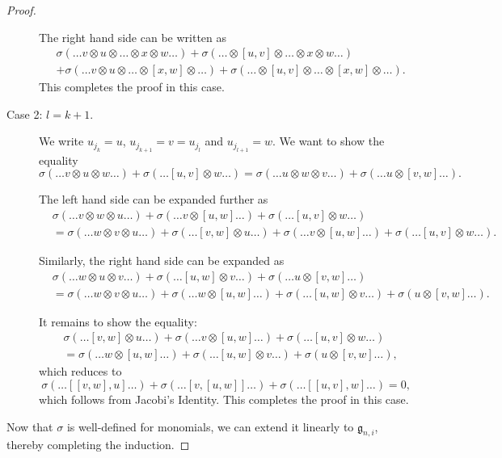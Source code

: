 \documentclass[12pt]{article}
\theoremstyle{thmstyle}
\theoremstyle{defstyle}
\newcommand{\frakg}{\mathfrak{g}}
\begin{document}
\begin{proof}
\begin{description}
    The right hand side can be written as 
    \begin{align*}
        &\sigma(\dots v\otimes u\otimes\dots\otimes x\otimes w\dots) + \sigma(\dots\otimes[u,v]\otimes\dots\otimes x\otimes w\dots)\\
        &+ \sigma(\dots v\otimes u\otimes\dots\otimes [x, w]\otimes\dots) + \sigma(\dots\otimes [u,v]\otimes\dots\otimes[x, w]\otimes\dots).
    \end{align*}
    This completes the proof in this case. 

    \item[Case 2: $l = k + 1$.] We write $u_{j_k} = u$, $u_{j_{k + 1}} = v = u_{j_l}$ and $u_{j_{l + 1}} = w$. We want to show the equality
    \begin{equation*}
        \sigma(\dots v\otimes u\otimes w\dots) + \sigma(\dots[u, v]\otimes w\dots) = \sigma(\dots u\otimes w\otimes v\dots) + \sigma(\dots u\otimes[v, w]\dots).
    \end{equation*}

    The left hand side can be expanded further as 
    \begin{align*}
        &\sigma(\dots v\otimes w\otimes u\dots) + \sigma(\dots v\otimes [u, w]\dots) + \sigma(\dots [u, v]\otimes w\dots)\\
        &= \sigma(\dots w\otimes v\otimes u\dots) + \sigma(\dots[v, w]\otimes u\dots) + \sigma(\dots v\otimes [u, w]\dots) + \sigma(\dots [u, v]\otimes w\dots).
    \end{align*}

    Similarly, the right hand side can be expanded as 
    \begin{align*}
        &\sigma(\dots w\otimes u\otimes v\dots) + \sigma(\dots[u, w]\otimes v\dots) + \sigma(\dots u\otimes[v, w]\dots)\\
        &= \sigma(\dots w\otimes v\otimes u\dots) + \sigma(\dots w\otimes [u, w]\dots) + \sigma(\dots[u, w]\otimes v\dots) + \sigma(u\otimes [v,w]\dots).
    \end{align*}

    It remains to show the equality: 
    \begin{align*}
        &\sigma(\dots[v, w]\otimes u\dots) + \sigma(\dots v\otimes [u, w]\dots) + \sigma(\dots [u, v]\otimes w\dots)\\
        &= \sigma(\dots w\otimes [u, w]\dots) + \sigma(\dots[u, w]\otimes v\dots) + \sigma(u\otimes [v,w]\dots),
    \end{align*}
    which reduces to 
    \begin{equation*}
        \sigma(\dots[[v, w], u]\dots) + \sigma(\dots[v,[u,w]]\dots) + \sigma(\dots[[u,v],w]\dots) = 0,
    \end{equation*}
    which follows from Jacobi's Identity. This completes the proof in this case.
    \end{description}

    Now that $\sigma$ is well-defined for monomials, we can extend it linearly to $\frakg_{n, i}$, thereby completing the induction.
\end{proof}
\end{document}
